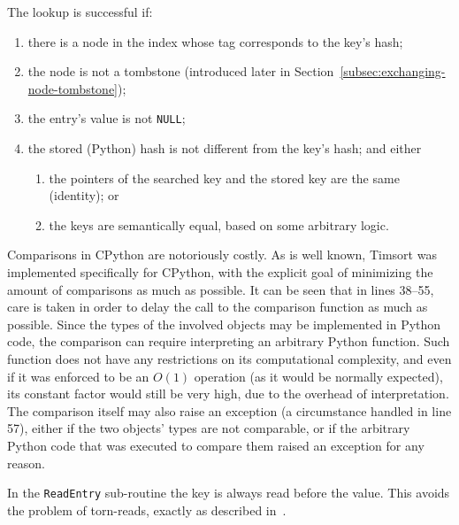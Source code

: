 The lookup is successful if:
\begin{enumerate}
    \item there is a node in the index whose tag corresponds to the key's hash;
    \item the node is not a tombstone (introduced later in Section~\ref{subsec:exchanging-node-tombstone});
    \item the entry's value is not \texttt{NULL};
    \item the stored (Python) hash is not different from the key's hash; and either
    \begin{enumerate}
        \item the pointers of the searched key and the stored key are the same (identity); or
        \item the keys are semantically equal, based on some arbitrary logic.
    \end{enumerate}
\end{enumerate}

Comparisons in CPython are notoriously costly.
As is well known, Timsort was implemented specifically for CPython, with the explicit goal of minimizing the amount of comparisons as much as possible.
It can be seen that in lines 38--55, care is taken in order to delay the call to the comparison function as much as possible.
Since the types of the involved objects may be implemented in Python code, the comparison can require interpreting an arbitrary Python function.
Such function does not have any restrictions on its computational complexity, and even if it was enforced to be an $O(1)$ operation (as it would be normally expected), its constant factor would still be very high, due to the overhead of interpretation.
The comparison itself may also raise an exception (a circumstance handled in line 57), either if the two objects' types are not comparable, or if the arbitrary Python code that was executed to compare them raised an exception for any reason.

In the \texttt{ReadEntry} sub-routine the key is always read before the value.
This avoids the problem of torn-reads, exactly as described in~\cite[\S4, Lookup]{maier}.

